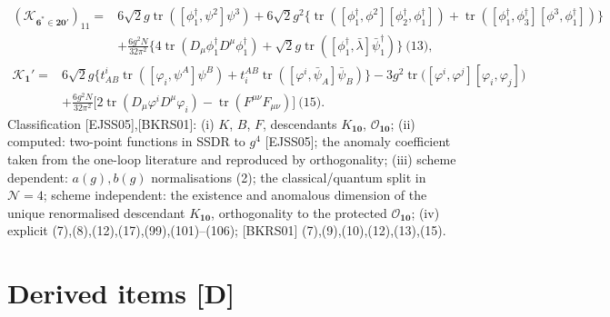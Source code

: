 \documentclass[10pt]{article}
\begin{document}
\begin{equation*}
\begin{aligned}
(\mathcal K_{\mathbf 6^*\in\mathbf{20}'})_{11}={}&6\sqrt2g\operatorname{tr}([\phi_1^\dagger,\psi^2]\psi^3)+6\sqrt2g^2\big\{\operatorname{tr}([\phi_1^\dagger,\phi^2][\phi_2^\dagger,\phi_1^\dagger])+\operatorname{tr}([\phi_1^\dagger,\phi_3^\dagger][\phi^3,\phi_1^\dagger])\big\}\\
&+\frac{6g^2N}{32\pi^2}\big\{4\operatorname{tr}(D_\mu\phi_1^\dagger D^\mu\phi_1^\dagger)+\sqrt2g\operatorname{tr}([\phi_1^\dagger,\bar\lambda]\bar\psi_1^\dagger)\big\}\ \text{(13)},
\end{aligned}
\end{equation*}
\begin{equation*}
\begin{aligned}
\mathcal K_{\mathbf 1}'={}&6\sqrt2g\big\{t^i_{AB}\operatorname{tr}([\varphi_i,\psi^A]\psi^B)+t_i^{AB}\operatorname{tr}([\varphi^i,\bar\psi_A]\bar\psi_B)\big\}-3g^2\operatorname{tr}\big([\varphi^i,\varphi^j][\varphi_i,\varphi_j]\big)\\
&+\frac{6g^2N}{32\pi^2}\big[2\operatorname{tr}(D_\mu\varphi^iD^\mu\varphi_i)-\operatorname{tr}(F^{\mu\nu}F_{\mu\nu})\big]\ \text{(15)}.
\end{aligned}
\end{equation*}
Classification [EJSS05],[BKRS01]: (i) $K$, $B$, $F$, descendants $K_{\mathbf{10}}$, $\mathcal O_{\mathbf{10}}$; (ii) computed: two-point functions in SSDR to $g^4$ [EJSS05]; the anomaly coefficient taken from the one-loop literature and reproduced by orthogonality; (iii) scheme dependent: $a(g),b(g)$ normalisations (2); the classical/quantum split in $\mathcal N=4$; scheme independent: the existence and anomalous dimension of the unique renormalised descendant $K_{\mathbf{10}}$, orthogonality to the protected $\mathcal O_{\mathbf{10}}$; (iv) explicit (7),(8),(12),(17),(99),(101)--(106); [BKRS01] (7),(9),(10),(12),(13),(15).

\section{Derived items [D]}
\end{document}
